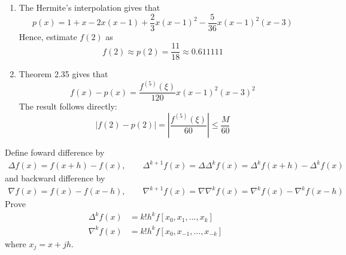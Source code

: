 \documentclass[11pt]{elegantbook}
\begin{document}
\begin{solution}
  \begin{enumerate}
    \item The Hermite's interpolation gives that
    \begin{equation*}
      p(x)=1+x-2x(x-1)+\frac{2}{3}x(x-1)^2-\frac{5}{36}x(x-1)^2(x-3)
    \end{equation*}
    Hence, estimate $f(2)$ as
    \begin{equation*}
      f(2)\approx p(2)= \frac{11}{18} \approx 0.611111
    \end{equation*}

    \item Theorem 2.35 gives that
    \begin{equation*}
      f(x)-p(x)=\frac{f^{(5)}(\xi)}{120}x(x-1)^2(x-3)^2
    \end{equation*}
    The result follows directly:
    \begin{equation*}
      |f(2)-p(2)|=\left|\frac{f^{(5)}(\xi)}{60}\right| \leq \frac{M}{60}
    \end{equation*}
  \end{enumerate}
\end{solution}

\vspace{1.5em}

\begin{problem}
  Define foward difference by
  \begin{align*}
    \Delta f(x) = f(x+h) - f(x) ,\qquad \Delta^{k+1} f(x) = \Delta \Delta^k f(x) = \Delta^k f(x+h) - \Delta^k f(x)
  \end{align*}
  and backward difference by
  \begin{align*}
    \nabla f(x) = f(x) - f(x-h), \qquad \nabla^{k+1} f(x) = \nabla \nabla^k f(x) = \nabla^k f(x) - \nabla^k f(x-h)
  \end{align*}
  Prove
  \begin{align}
    \Delta^k f(x) &= k!h^kf[x_0,x_1,...,x_k]\\
    \nabla^k f(x) &= k!h^kf[x_0,x_{-1},...,x_{-k}]
  \end{align}
  where $x_j=x+jh$.
\end{problem}
\end{document}
